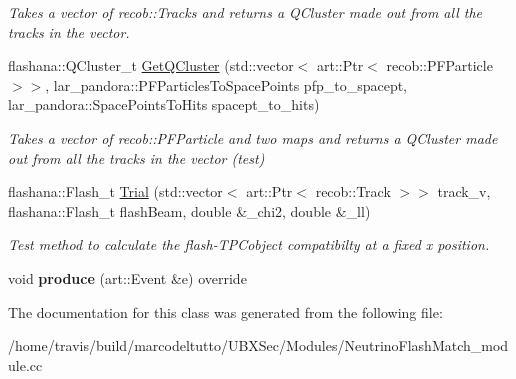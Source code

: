 \begin{DoxyCompactItemize}
\begin{DoxyCompactList}\small\item\em \-Takes a vector of recob\-::\-Tracks and returns a \-Q\-Cluster made out from all the tracks in the vector. \end{DoxyCompactList}\item 
\hypertarget{classNeutrinoFlashMatch_a93132a117b6ea907ba95bba4a6af6107}{flashana\-::\-Q\-Cluster\-\_\-t \hyperlink{classNeutrinoFlashMatch_a93132a117b6ea907ba95bba4a6af6107}{\-Get\-Q\-Cluster} (std\-::vector$<$ art\-::\-Ptr$<$ recob\-::\-P\-F\-Particle $>$$>$, lar\-\_\-pandora\-::\-P\-F\-Particles\-To\-Space\-Points pfp\-\_\-to\-\_\-spacept, lar\-\_\-pandora\-::\-Space\-Points\-To\-Hits spacept\-\_\-to\-\_\-hits)}\label{classNeutrinoFlashMatch_a93132a117b6ea907ba95bba4a6af6107}

\begin{DoxyCompactList}\small\item\em \-Takes a vector of recob\-::\-P\-F\-Particle and two maps and returns a \-Q\-Cluster made out from all the tracks in the vector (test) \end{DoxyCompactList}\item 
\hypertarget{classNeutrinoFlashMatch_aa957152a8c232e4b23cc7544aa6bfdd1}{flashana\-::\-Flash\-\_\-t \hyperlink{classNeutrinoFlashMatch_aa957152a8c232e4b23cc7544aa6bfdd1}{\-Trial} (std\-::vector$<$ art\-::\-Ptr$<$ recob\-::\-Track $>$$>$ track\-\_\-v, flashana\-::\-Flash\-\_\-t flash\-Beam, double \&\-\_\-chi2, double \&\-\_\-ll)}\label{classNeutrinoFlashMatch_aa957152a8c232e4b23cc7544aa6bfdd1}

\begin{DoxyCompactList}\small\item\em \-Test method to calculate the flash-\/\-T\-P\-Cobject compatibilty at a fixed x position. \end{DoxyCompactList}\item 
\hypertarget{classNeutrinoFlashMatch_a00578af5672ff925f80c1b9482c8b4ff}{void {\bfseries produce} (art\-::\-Event \&e) override}\label{classNeutrinoFlashMatch_a00578af5672ff925f80c1b9482c8b4ff}

\end{DoxyCompactItemize}


\-The documentation for this class was generated from the following file\-:\begin{DoxyCompactItemize}
\item 
/home/travis/build/marcodeltutto/\-U\-B\-X\-Sec/\-Modules/\-Neutrino\-Flash\-Match\-\_\-module.\-cc\end{DoxyCompactItemize}
